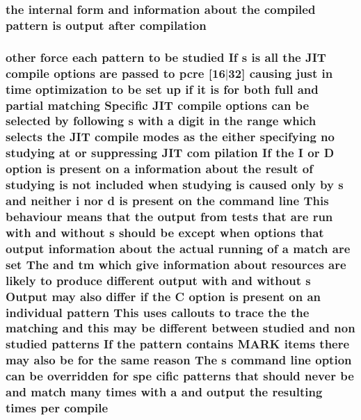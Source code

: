 \subsubsection[{\texorpdfstring{compilation}{compilation}}]{\setlength{\rightskip}{0pt plus 5cm}the internal form and information about the {\bf compiled} {\bf pattern} {\bf is} {\bf output} {\bf after} compilation}\hypertarget{pcretest_8txt_a19181314a725efbbf500f6685a278669}{}\label{pcretest_8txt_a19181314a725efbbf500f6685a278669}
\subsubsection[{\texorpdfstring{compile}{compile}}]{ other force each {\bf pattern} {\bf to} {\bf be} {\bf studied} If {\bf s} {\bf is} {\bf all} the J\+IT compile {\bf options} {\bf are} passed {\bf to} {\bf pcre} \mbox{[}16$\vert$32\mbox{]} causing just {\bf in} {\bf time} optimization {\bf to} {\bf be} {\bf set} up {\bf if} {\bf it} {\bf is} for both full and {\bf partial} {\bf matching} Specific J\+IT compile {\bf options} {\bf can} {\bf be} {\bf selected} by following {\bf s} {\bf with} {\bf a} digit {\bf in} the range {\bf which} selects the J\+IT compile {\bf modes} {\bf as} the either {\bf specifying} no {\bf studying} at {\bf or} suppressing J\+IT com pilation If the {\bf I} {\bf or} {\bf D} {\bf option} {\bf is} {\bf present} {\bf on} {\bf a} information about the {\bf result} {\bf of} {\bf studying} {\bf is} {\bf not} {\bf included} when {\bf studying} {\bf is} caused only by {\bf s} and neither {\bf i} nor {\bf d} {\bf is} {\bf present} {\bf on} the {\bf command} {\bf line} This behaviour means that the {\bf output} {\bf from} {\bf tests} that {\bf are} {\bf run} {\bf with} and without {\bf s} should {\bf be} {\bf except} when {\bf options} that {\bf output} information about the actual running {\bf of} {\bf a} {\bf match} {\bf are} {\bf set} The and {\bf tm} {\bf which} give information about resources {\bf are} likely {\bf to} produce different {\bf output} {\bf with} and without {\bf s} Output may also differ {\bf if} the {\bf C} {\bf option} {\bf is} {\bf present} {\bf on} an individual {\bf pattern} This uses callouts {\bf to} trace the the {\bf matching} and {\bf this} may {\bf be} different between {\bf studied} and non {\bf studied} {\bf patterns} If the {\bf pattern} {\bf contains} M\+A\+RK items there may also {\bf be} for the same {\bf reason} The {\bf s} {\bf command} {\bf line} {\bf option} {\bf can} {\bf be} overridden for spe cific {\bf patterns} that should never {\bf be} and {\bf match} many {\bf times} {\bf with} {\bf a} and {\bf output} the resulting {\bf times} per compile}\hypertarget{pcretest_8txt_a82c5cb071eb724ee382baacb76c44a27}{}\label{pcretest_8txt_a82c5cb071eb724ee382baacb76c44a27}
